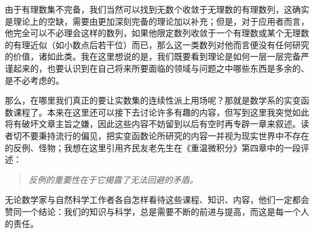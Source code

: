 \documentclass[12pt,a4paper]{article}
\begin{document}
{{			由于有理数集不完备，我们当然可以找到无数个收敛于无理数的有理数列，这确实是理论上的空缺，需要由更加深刻完备的理论加以补充；但是，对于应用者而言，他完全可以不必理会这样的数列，如果他限定数列收敛于一个有理数或某个无理数的有理近似（如小数点后若干位）而已，那么这一类数列对他而言便没有任何研究的价值，诸如此类。我在这里想说的是，我们既要看到理论是如何一层一层完备严谨起来的，也要认识到在自己将来所要面临的领域与问题之中哪些东西是多余的、是不必考虑的。
			
			那么，在哪里我们真正的要让实数集的连续性派上用场呢？那就是数学系的实变函数课程了。本来在这里还可以接下去讨论许多有趣的内容，但写到这里我突觉如此将有破坏文章主旨之嫌，因此这些内容不妨留到以后有空时再专辟一章来叙述。读者切不要秉持流行的偏见，把实变函数论所研究的内容一并视为现实世界中不存在的反例、怪物；我想在这里引用齐民友老先生在《重温微积分》第四章中的一段评述：
			\begin{quote}\itshape
				反例的重要性在于它揭露了无法回避的矛盾。
			\end{quote}
			
			无论数学家与自然科学工作者各自怎样看待这些课程、知识、内容，他们一定都会赞同一个结论：我们的知识与科学，总是需要不断的前进与提高，而这是每一个人的责任。
			
		}
	
	}
	
\end{document}
